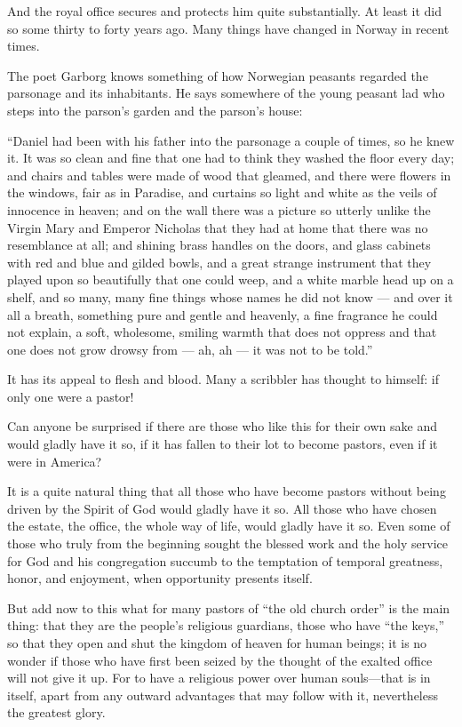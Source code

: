 And the royal office secures and protects him quite substantially. At least it did so some thirty to forty years ago. Many things have changed in Norway in recent times.

The poet Garborg knows something of how Norwegian peasants regarded the parsonage and its inhabitants. He says somewhere of the young peasant lad who steps into the parson’s garden and the parson’s house:

“Daniel had been with his father into the parsonage a couple of times, so he knew it. It was so clean and fine that one had to think they washed the floor every day; and chairs and tables were made of wood that gleamed, and there were flowers in the windows, fair as in Paradise, and curtains so light and white as the veils of innocence in heaven; and on the wall there was a picture so utterly unlike the Virgin Mary and Emperor Nicholas that they had at home that there was no resemblance at all; and shining brass handles on the doors, and glass cabinets with red and blue and gilded bowls, and a great strange instrument that they played upon so beautifully that one could weep, and a white marble head up on a shelf, and so many, many fine things whose names he did not know — and over it all a breath, something pure and gentle and heavenly, a fine fragrance he could not explain, a soft, wholesome, smiling warmth that does not oppress and that one does not grow drowsy from — ah, ah — it was not to be told.”


It has its appeal to flesh and blood. Many a scribbler has thought to himself: if only one were a pastor!

Can anyone be surprised if there are those who like this for their own sake and would gladly have it so, if it has fallen to their lot to become pastors, even if it were in America?

It is a quite natural thing that all those who have become pastors without being driven by the Spirit of God would gladly have it so. All those who have chosen the estate, the office, the whole way of life, would gladly have it so. Even some of those who truly from the beginning sought the blessed work and the holy service for God and his congregation succumb to the temptation of temporal greatness, honor, and enjoyment, when opportunity presents itself.

But add now to this what for many pastors of “the old church order” is the main thing: that they are the people’s religious guardians, those who have “the keys,” so that they open and shut the kingdom of heaven for human beings; it is no wonder if those who have first been seized by the thought of the exalted office will not give it up. For to have a religious power over human souls—that is in itself, apart from any outward advantages that may follow with it, nevertheless the greatest glory.

